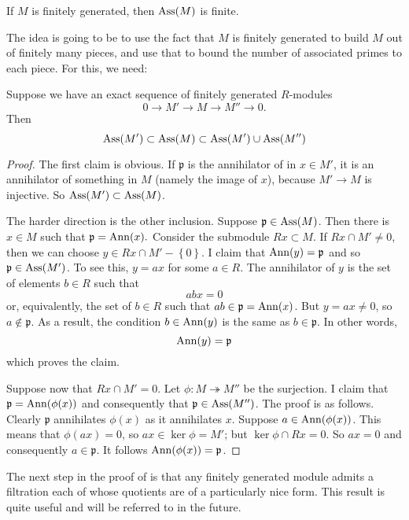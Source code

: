 \begin{proposition} \label{finiteassm}
If $M$ is finitely generated, then $\operatorname{Ass}(M)$ is finite.
\end{proposition}

The idea is going to be to use the fact that $M$ is finitely generated to build
$M$ out of finitely many pieces, and use that to bound the number of associated
primes to each piece. For this, we need:

\begin{lemma} \label{assexact} 
Suppose we have an exact sequence of finitely generated $R$-modules
\[ 0 \to M' \to M \to M'' \to 0.  \]
Then 
\[\operatorname{Ass}(M') \subset \operatorname{Ass}(M) \subset \operatorname{Ass}(M') \cup \operatorname{Ass}(M'')  \]
\end{lemma} 
\begin{proof} 
The first claim is obvious. If $\mathfrak{p}$ is the annihilator of
in $x \in M'$, it is an annihilator of something in $M$ (namely the image of
$x$), because
$M' \to M$ is injective. So $\operatorname{Ass}(M') \subset \operatorname{Ass}(M)$. 

The harder direction is the other inclusion. Suppose $\mathfrak{p} \in \operatorname{Ass}(M)$.
Then there is $x \in M$ such that
$\mathfrak{p} = \operatorname{Ann}(x).$
Consider the submodule $Rx \subset M$.  If $Rx \cap M' \neq 0$, then we can
choose $y \in Rx \cap M' - \left\{0\right\}$. I claim that $\operatorname{Ann}(y) =
\mathfrak{p}$ and so $\mathfrak{p} \in \operatorname{Ass}(M')$.
To see this, $ y = ax$ for some $a \in R$. The annihilator of $y$ is the set of elements
$b \in R$ such that
\[ abx = 0  \]
or, equivalently, the set of $b \in R$ such that $ab \in \mathfrak{p} =
\operatorname{Ann}(x)$. But $y = ax \neq 0$, so $a \notin \mathfrak{p}$. As a
result, the condition $b \in \operatorname{Ann}(y)$ is the same as $b \in \mathfrak{p}$. In
other words, 
\[ \operatorname{Ann}(y) = \mathfrak{p}  \]
which proves the claim.

Suppose now that  $Rx \cap M' = 0$. Let $\phi: M \twoheadrightarrow M''$
be the surjection. I claim that $\mathfrak{p} = \operatorname{Ann}(\phi(x))$ and
consequently that
$\mathfrak{p} \in \operatorname{Ass}(M'')$.  The proof is as follows. Clearly $\mathfrak{p}$
annihilates $\phi(x)$ as it annihilates $x$. Suppose $a \in \operatorname{Ann}(\phi(x))$.
This means that $\phi(ax) = 0$, so $ax \in \ker \phi=M'$; but $\ker \phi \cap Rx =
0$. So $ax = 0$ and consequently $a \in \mathfrak{p}$. It follows $\operatorname{Ann}(\phi(x)) = \mathfrak{p}$. 
\end{proof} 

The next step in the proof of  is that any
finitely generated module
admits a filtration each of whose quotients are of a particularly nice form.
This result is quite useful and will be referred to in the future.

